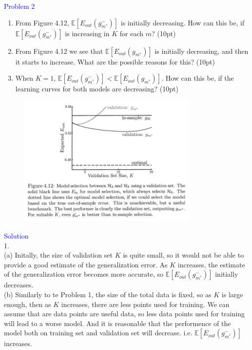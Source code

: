 \textcolor{blue}{Problem 2}
\begin{enumerate}
    \item From Figure 4.12, $\mathbb{E}[E_{out}(g^-_{m^*})]$ is initially decreasing. How can this be, if $\mathbb{E}[E_{out}(g^-_{m^*})]$ is increasing in $K$ for each $m$? (10pt)
    \item From Figure 4.12 we see that $\mathbb{E}[E_{out}(g_{m^*})]$ is initially decreasing, and then it starts to increase. What are the possible reasons for this? (10pt)
    \item When $K=1$, $\mathbb{E}[E_{out}(g^-_{m^*})]<\mathbb{E}[E_{out}(g_{m^*})]$. How can this be, if the learning curves for both models are decreasing? (10pt)
\end{enumerate}
\begin{figure}[htbp]
    \centering
    \includegraphics[width=0.8\textwidth]{../fig/figure412.png}
\end{figure}
\par


\textcolor{blue}{Solution}\\
1.\\
(a) Initally, the size of validation set $K$ is quite small, so it would not be able to provide a good estimate of the generalization error. As $K$ increases, the estimate of the generalization error becomes more accurate, so $\mathbb{E}[E_{out}(g^-_{m^*})]$ initially decreases.\\
(b) Similarly to te Problem 1, the size of the total data is fixed, so as $K$ is large enough, then as $K$ increases, there are less points used for training. We can assume that are data points are useful data, so less data points used for training will lead to a worse model. And it is reasonable that the performence of the model both on training set and validation set will decrease. i.e. $\mathbb{E}[E_{out}(g^-_{m^*})]$ increases.

